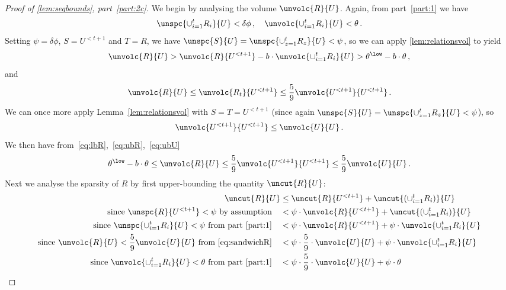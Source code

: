 \begin{proof}[Proof of \cref{lem:seqbounds}, part~\eqref{part:2c}]
	We begin by analysing the volume $\unvolc{R}{U}$. Again, from part~\eqref{part:1} we have
	\begin{equation*}
		\unspc{\cup_{i=1}^{t} R_i}{U} < \delta \phi\, , \quad \unvolc{\cup_{i=1}^{t} R_i}{U} < \theta \,.
	\end{equation*}
	Setting $\psi = \delta \phi$, $S=U^{<t+1}$ and $T=R$,  we have $\unspc{S}{U} = \unspc{\cup_{z=1}^t R_z}{U} < \psi$, so we can apply \cref{lem:relationsvol} to yield
	\begin{equation} \label{eq:lbR}
		\unvolc{R}{U} > \unvolc{R}{U^{<t+1}} - b \cdot \unvolc{\cup_{i=1}^{t} R_i}{U} > \theta^{\low}-b \cdot \theta \, ,
	\end{equation}
	and
	\begin{equation}  \label{eq:ubR}
		\unvolc{R}{U} \le \unvolc{R_t}{U^{<t+1}} \le \frac{5}{9}\unvolc{U^{<t+1}}{U^{<t+1}} \, .
	\end{equation}
	We can once more apply Lemma~\ref{lem:relationsvol} with $S=T=U^{<t+1}$ (since again $\unspc{S}{U} = \unspc{\cup_{z=1}^t R_z}{U} < \psi$), so
	\begin{equation}
		 \label{eq:ubU}
		\unvolc{U^{<t+1}}{U^{<t+1}} \le \unvolc{U}{U} \, .
	\end{equation}
	We then have from~\eqref{eq:lbR},~\eqref{eq:ubR},~\eqref{eq:ubU}
	\begin{equation}
		\label{eq:sandwichR}
		 \theta^{\low}-b \cdot \theta \le \unvolc{R}{U} \le  \frac{5}{9}\unvolc{U^{<t+1}}{U^{<t+1}} \le  \frac{5}{9}\unvolc{U}{U} \, .
	\end{equation}
	Next we analyse the sparsity of $R$ by first upper-bounding the quantity $\uncut{R}{U}$:
	\begin{align}
		\uncut{R}{U} & \le {\uncut{R}{U^{<t+1}}+\uncut{(\cup_{i =1}^{t}R_i)}{U}} \\
		\text{since $\unspc{R}{U^{<t+1}} <\psi$ by assumption}\quad& < {\psi \cdot \unvolc{R}{U^{<t+1}}+\uncut{(\cup_{i =1}^{t}R_i)}{U}}\\
		\text{since $\unspc{\cup_{i =1}^{t}R_i}{U} <\psi$ from part~\eqref{part:1}} \quad & < {\psi \cdot \unvolc{R}{U^{<t+1}}+\psi \cdot \unvolc{\cup_{i =1}^{t}R_i}{U}} \\
		\text{since $\unvolc{R}{U} < \frac{5}{9}\unvolc{U}{U}$ from~\eqref{eq:sandwichR}} \quad& < {\psi \cdot  \frac{5}{9} \cdot \unvolc{U}{U}+\psi \cdot \unvolc{\cup_{i =1}^{t}R_i}{U}}\\
		\text{since $\unvolc{\cup_{i =1}^{t}R_i}{U}< \theta $ from  part~\eqref{part:1}}\quad & < \psi \cdot  \frac{5}{9} \cdot \unvolc{U}{U}+\psi \cdot \theta  \\

\end{align}
\end{proof}
